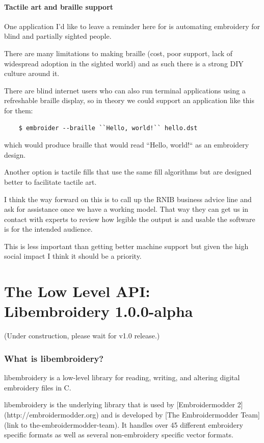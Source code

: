 \documentclass[a4paper, 11pt]{report}
\newcommand{\libembversion}{1.0.0-alpha}
\begin{document}
\subsubsection{Tactile art and braille support}

One application I'd like to leave a reminder here for is automating embroidery
for blind and partially sighted people.

There are many limitations to making braille (cost, poor support, lack of
widespread adoption in the sighted world) and as such there is a strong DIY
culture around it.

There are blind internet users who can also run terminal applications using a
refreshable braille display, so in theory we could support an application like
this for them:

\begin{verbatim}
    $ embroider --braille ``Hello, world!`` hello.dst
\end{verbatim}

which would produce braille that would read ``Hello, world!`` as an embroidery design.

Another option is tactile fills that use the same fill algorithms but are
designed better to facilitate tactile art.

I think the way forward on this is to call up the RNIB business advice line and ask for assistance once we have a working model. That way they can get us in contact with experts to review how legible the output is and usable the software is for the intended audience.

This is less important than getting better machine support but given the high social impact I think it should be a priority.

\chapter{The Low Level API: Libembroidery \libembversion}

(Under construction, please wait for v1.0 release.)

\subsection{What is libembroidery?}

libembroidery is a low-level library for reading, writing, 
and altering digital embroidery files in C.

libembroidery is the underlying library that is used by [Embroidermodder 2](http://embroidermodder.org)
and is developed by [The Embroidermodder Team](link to the-embroidermodder-team).
It handles over 45 different embroidery specific formats as well
as several non-embroidery specific vector formats.
\end{document}
